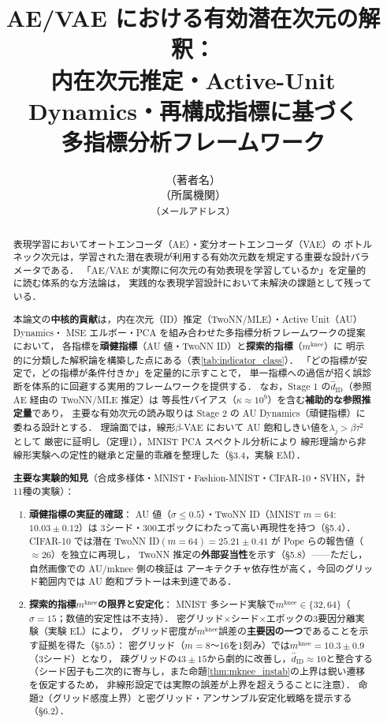 \documentclass[11pt,a4paper]{jsarticle}
\title{AE/VAE における有効潜在次元の解釈：\\
       内在次元推定・Active-Unit Dynamics・再構成指標に基づく\\
       多指標分析フレームワーク}
\author{（著者名）\\
{\small （所属機関）}\\
{\small \texttt{（メールアドレス）}}}
\date{}
\newcommand{\kap}{\kappa}
\newcommand{\mknee}{m^{\mathrm{knee}}}
\begin{document}
\maketitle

\begin{abstract}
表現学習においてオートエンコーダ（AE）・変分オートエンコーダ（VAE）の
ボトルネック次元は，学習された潜在表現が利用する有効次元数を規定する重要な設計パラメータである．
「AE/VAE が実際に何次元の有効表現を学習しているか」を定量的に読む体系的な方法論は，
実践的な表現学習設計において未解決の課題として残っている．

本論文の\textbf{中核的貢献}は，内在次元（ID）推定（TwoNN/MLE）・Active Unit（AU）Dynamics・
MSE エルボー・PCA を組み合わせた多指標分析フレームワークの提案において，
各指標を\textbf{頑健指標}（AU 値・TwoNN ID）と\textbf{探索的指標}（$\mknee$）に
明示的に分類した解釈論を構築した点にある（表\ref{tab:indicator_class}）．
「どの指標が安定で，どの指標が条件付きか」を定量的に示すことで，
単一指標への過信が招く誤診断を体系的に回避する実用的フレームワークを提供する．
なお，Stage 1 の$\hat{d}_\mathrm{ID}$（参照 AE 経由の TwoNN/MLE 推定）は
等長性バイアス（$\kap \approx 10^9$）を含む\textbf{補助的な参照推定量}であり，
主要な有効次元の読み取りは Stage 2 の AU Dynamics（頑健指標）に委ねる設計とする．
理論面では，線形$\beta$-VAE において AU 飽和しきい値を$\lambda_j > \beta\tau^2$として
厳密に証明し（定理1），MNIST PCA スペクトル分析により
線形理論から非線形実験への定性的継承と定量的乖離を整理した（§3.4，実験 EM）．

\textbf{主要な実験的知見}（合成多様体・MNIST・Fashion-MNIST・CIFAR-10・SVHN，計11種の実験）：
\begin{enumerate}
  \item \textbf{頑健指標の実証的確認}：
        AU 値（$\sigma \leq 0.5$）・TwoNN ID（MNIST $m=64$: $10.03 \pm 0.12$）は
        3シード・300エポックにわたって高い再現性を持つ（§5.4）．
        CIFAR-10 では潜在 TwoNN ID$(m=64)=25.21\pm0.41$ が Pope らの報告値（$\approx26$）を独立に再現し，
        TwoNN 推定の\textbf{外部妥当性}を示す（§5.8）——ただし，自然画像での AU/mknee 側の検証は
        アーキテクチャ依存性が高く，今回のグリッド範囲内では AU 飽和プラトーは未到達である．
  \item \textbf{探索的指標$\mknee$の限界と安定化}：
        MNIST 多シード実験で$\mknee \in \{32, 64\}$（$\sigma=15$；数値的安定性は不支持）．
        密グリッド×シード×エポックの3要因分離実験（実験 EL）により，
        グリッド密度が$\mknee$誤差の\textbf{主要因の一つ}であることを示す証拠を得た（§5.5）：
        密グリッド（$m=8$〜16を1刻み）では$\mknee = 10.3 \pm 0.9$（3シード）となり，
        疎グリッドの$43\pm15$から劇的に改善し，$\hat{d}_\mathrm{ID} \approx 10$と整合する
        （シード因子も二次的に寄与し，また命題\ref{thm:mknee_instab}の上界は鋭い遷移を仮定するため，
        非線形設定では実際の誤差が上界を超えうることに注意）．
        命題2（グリッド感度上界）と密グリッド・アンサンブル安定化戦略を提示する（§6.2）．
\end{enumerate}


\end{abstract}
\end{document}
